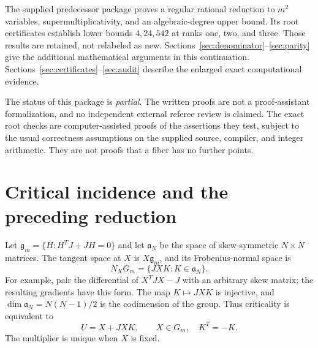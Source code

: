 \documentclass[11pt]{article}
\theoremstyle{remark}\newtheorem{remark}[theorem]{Remark}
\begin{document}
The supplied predecessor package \cite{prior} proves a regular rational reduction to $m^2$ variables, supermultiplicativity, and an algebraic-degree upper bound. Its root certificates establish lower bounds $4,24,542$ at ranks one, two, and three. Those results are retained, not relabeled as new. Sections~\ref{sec:denominator}--\ref{sec:parity} give the additional mathematical arguments in this continuation. Sections~\ref{sec:certificates}--\ref{sec:audit} describe the enlarged exact computational evidence.

The status of this package is \emph{partial}. The written proofs are not a proof-assistant formalization, and no independent external referee review is claimed. The exact root checks are computer-assisted proofs of the assertions they test, subject to the usual correctness assumptions on the supplied source, compiler, and integer arithmetic. They are not proofs that a fiber has no further points.

\section{Critical incidence and the preceding reduction}\label{sec:incidence}
Let $\mathfrak g_m=\{H:H^TJ+JH=0\}$ and let $\mathfrak a_N$ be the space of skew-symmetric $N\times N$ matrices. The tangent space at $X$ is $X\mathfrak g_m$, and its Frobenius-normal space is
\[
N_XG_m=\{JXK:K\in\mathfrak a_N\}.
\]
For example, pair the differential of $X^TJX-J$ with an arbitrary skew matrix; the resulting gradients have this form. The map $K\mapsto JXK$ is injective, and $\dim\mathfrak a_N=N(N-1)/2$ is the codimension of the group. Thus criticality is equivalent to
\begin{equation}\label{eq:incidence}
U=X+JXK,\qquad X\in G_m,\quad K^T=-K.
\end{equation}
The multiplier is unique when $X$ is fixed.
\end{document}
